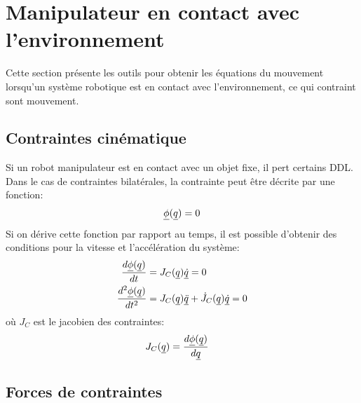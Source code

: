 \newpage
\section{Manipulateur en contact avec l'environnement}
\label{sec:contact}

Cette section présente les outils pour obtenir les équations du mouvement lorsqu'un système robotique est en contact avec l'environnement, ce qui contraint sont mouvement. 

\subsection{Contraintes cinématique}
\label{sec:constraints}
Si un robot manipulateur est en contact avec un objet fixe, il pert certains DDL. Dans le cas de contraintes bilatérales, la contrainte peut être décrite par une fonction:
\begin{align}
\underline{\phi}( \underline{ q } ) = 0
\label{eq:constraint}
\end{align}
Si on dérive cette fonction par rapport au temps, il est possible d'obtenir des conditions pour la vitesse et l'accélération du système:
\begin{align}
\frac{d \underline{\phi}( \underline{ q } ) }{dt}     &= J_C( \underline{ q } ) \underline{\dot{q}}  = 0 \\
\frac{d^2 \underline{\phi}( \underline{ q } ) }{dt^2} &= J_C( \underline{ q } ) \underline{\ddot{q}}  + \dot{J}_C( \underline{ q } ) \underline{\dot{q}} = 0 
\label{eq:constraint_diff}
\end{align}
où $J_C$ est le jacobien des contraintes:
\begin{align}
J_C( \underline{ q } )                    &= \frac{d \underline{\phi}( \underline{ q } ) }{d\underline{ q }}
\label{eq:constraint_jaco}
\end{align}

\subsection{Forces de contraintes}
\label{sec:constraint_forces}

